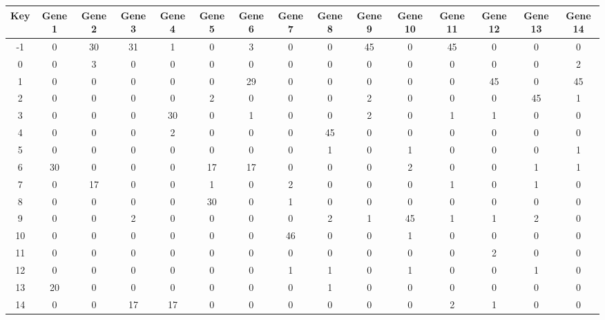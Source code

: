 \begin{tabular}{|c|c|c|c|c|c|c|c|c|c|c|c|c|c|c|}
\hline
Key & Gene 1 & Gene 2 & Gene 3 & Gene 4 & Gene 5 & Gene 6 & Gene 7 & Gene 8 & Gene 9 & Gene 10 & Gene 11 & Gene 12 & Gene 13 & Gene 14 \\
\hline
-1 & 0 & 30 & 31 & 1 & 0 & 3 & 0 & 0 & 45 & 0 & 45 & 0 & 0 & 0 \\
0 & 0 & 3 & 0 & 0 & 0 & 0 & 0 & 0 & 0 & 0 & 0 & 0 & 0 & 2 \\
1 & 0 & 0 & 0 & 0 & 0 & 29 & 0 & 0 & 0 & 0 & 0 & 45 & 0 & 45 \\
2 & 0 & 0 & 0 & 0 & 2 & 0 & 0 & 0 & 2 & 0 & 0 & 0 & 45 & 1 \\
3 & 0 & 0 & 0 & 30 & 0 & 1 & 0 & 0 & 2 & 0 & 1 & 1 & 0 & 0 \\
4 & 0 & 0 & 0 & 2 & 0 & 0 & 0 & 45 & 0 & 0 & 0 & 0 & 0 & 0 \\
5 & 0 & 0 & 0 & 0 & 0 & 0 & 0 & 1 & 0 & 1 & 0 & 0 & 0 & 1 \\
6 & 30 & 0 & 0 & 0 & 17 & 17 & 0 & 0 & 0 & 2 & 0 & 0 & 1 & 1 \\
7 & 0 & 17 & 0 & 0 & 1 & 0 & 2 & 0 & 0 & 0 & 1 & 0 & 1 & 0 \\
8 & 0 & 0 & 0 & 0 & 30 & 0 & 1 & 0 & 0 & 0 & 0 & 0 & 0 & 0 \\
9 & 0 & 0 & 2 & 0 & 0 & 0 & 0 & 2 & 1 & 45 & 1 & 1 & 2 & 0 \\
10 & 0 & 0 & 0 & 0 & 0 & 0 & 46 & 0 & 0 & 1 & 0 & 0 & 0 & 0 \\
11 & 0 & 0 & 0 & 0 & 0 & 0 & 0 & 0 & 0 & 0 & 0 & 2 & 0 & 0 \\
12 & 0 & 0 & 0 & 0 & 0 & 0 & 1 & 1 & 0 & 1 & 0 & 0 & 1 & 0 \\
13 & 20 & 0 & 0 & 0 & 0 & 0 & 0 & 1 & 0 & 0 & 0 & 0 & 0 & 0 \\
14 & 0 & 0 & 17 & 17 & 0 & 0 & 0 & 0 & 0 & 0 & 2 & 1 & 0 & 0 \\
\hline
\end{tabular}